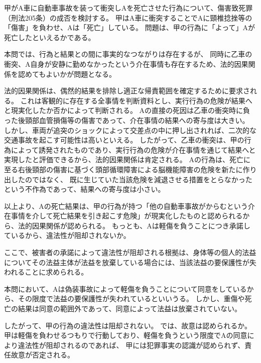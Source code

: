 \documentclass[11pt]{jsarticle}
\title{\vspace{-30mm}{\textgt{\Large{\fbox{10} 偽装事故の悲劇}}}}
\date{\vspace{-15mm}}
\begin{document}
\maketitle

\sectionA{}
	甲がA車に自動車事故を装って衝突しAを死亡させた行為について、傷害致死罪（刑法205条）の成否を検討する。
	\sectionB{}
		甲はA車に衝突することでAに頸椎捻挫等の「傷害」を負わせ、Aは「死亡」している。
		問題は、甲の行為に「よって」Aが死亡したといえるかである。
		
		本問では、行為と結果との間に事実的なつながりは存在するが、
		同時に乙車の衝突、A自身が安静に勤めなかったという介在事情も存在するため、法的因果関係を認めてもよいかが問題となる。
		
		法的因果関係は、偶然的結果を排除し適正な帰責範囲を確定するために要求される。
		これは客観的に存在する全事情を判断資料とし、実行行為の危険が結果へと現実化したか否かによって判断される。
			Aの直接の死因は乙車の衝突時に負った後頸部血管損傷等の傷害であって、介在事情の結果への寄与度は大きい。
			しかし、車両が追突のショックによって交差点の中に押し出されれば、二次的な交通事故を起こす可能性は高いといえる。
			したがって、乙車の衝突は、甲の行為によって誘発されたものであり、実行行為の危険が介在事情を通じて結果へと実現したと評価できるから、法的因果関係は肯定される。
			Aの行為は、死亡に至る右後頸部の傷害に基づく頭部循環障害による脳機能障害の危険を新たに作り出したのではなく、
			既に生じていた当該危険を減退させる措置をとらなかったという不作為であって、結果への寄与度は小さい。
			
			以上より、Aの死亡結果は、甲の行為が持つ「他の自動車事故がからむという介在事情を介して死亡結果を引き起こす危険」が現実化したものと認められるから、法的因果関係が認められる。
	\sectionB{}
		もっとも、Aは軽傷を負うことにつき承諾しているから、違法性が阻却されないか。
		
		ここで、被害者の承諾によって違法性が阻却される根拠は、身体等の個人的法益についてその法益主体が法益を放棄している場合には、当該法益の要保護性が失われることに求められる。
		
		本問において、Aは偽装事故によって軽傷を負うことについて同意をしているから、その限度で法益の要保護性が失われているといいうる。
		しかし、重傷や死亡の結果は同意の範囲外であって、同意によって法益は放棄されていない。
		
		したがって、甲の行為の違法性は阻却されない。
	\sectionB{}
		では、故意は認められるか。
		甲は軽傷を負わせるつもりで行動しており、軽傷を負うという限度でAの同意により違法性が阻却されるのであれば、
		甲には犯罪事実の認識が認められず、責任故意が否定される。
		
\end{document}
